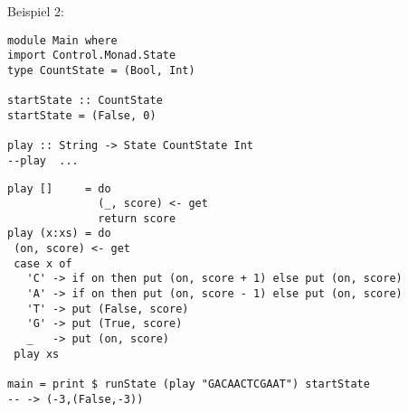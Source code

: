 \documentclass{beamer}
\begin{document}
\begin{frame}[fragile]
Beispiel 2:
\begin{verbatim}
module Main where
import Control.Monad.State
type CountState = (Bool, Int)
 
startState :: CountState
startState = (False, 0)

play :: String -> State CountState Int
--play  ...

\end{verbatim}
\end{frame}

\begin{frame}[fragile]
\begin{verbatim}
play []     = do
              (_, score) <- get
              return score
play (x:xs) = do
 (on, score) <- get
 case x of
   'C' -> if on then put (on, score + 1) else put (on, score)
   'A' -> if on then put (on, score - 1) else put (on, score)
   'T' -> put (False, score)
   'G' -> put (True, score)
   _   -> put (on, score)
 play xs

main = print $ runState (play "GACAACTCGAAT") startState
-- -> (-3,(False,-3))
\end{verbatim}
\end{frame}
\end{document}
